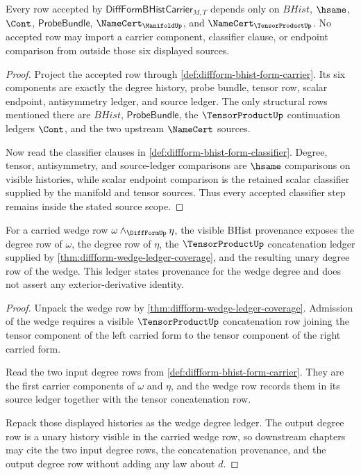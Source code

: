 \begin{theorem}
\label{thm:diffform-source-scope}
Every row accepted by $\mathsf{DiffFormBHistCarrier}_{M,T}$ depends only on
$BHist$, $\hsame$, $\Cont$, $\mathsf{ProbeBundle}$,
$\NameCert_{\ManifoldUp}$, and $\NameCert_{\TensorProductUp}$. No accepted
row may import a carrier component, classifier clause, or endpoint comparison
from outside those six displayed sources.
\end{theorem}
\begin{proof}
Project the accepted row through
\autoref{def:diffform-bhist-form-carrier}. Its six components are exactly the
degree history, probe bundle, tensor row, scalar endpoint, antisymmetry
ledger, and source ledger. The only structural rows mentioned there are
$BHist$, $\mathsf{ProbeBundle}$, the $\TensorProductUp$ continuation ledgers
$\Cont$, and the two upstream $\NameCert$ sources.

Now read the classifier clauses in
\autoref{def:diffform-bhist-form-classifier}. Degree, tensor, antisymmetry,
and source-ledger comparisons are $\hsame$ comparisons on visible histories,
while scalar endpoint comparison is the retained scalar classifier supplied by
the manifold and tensor sources. Thus every accepted classifier step remains
inside the stated source scope.
\end{proof}

\begin{theorem}
\label{thm:diffform-wedge-degree-ledger}
For a carried wedge row $\omega\wedge_{\DiffFormUp}\eta$, the visible BHist
provenance exposes the degree row of $\omega$, the degree row of $\eta$, the
$\TensorProductUp$ concatenation ledger supplied by
\autoref{thm:diffform-wedge-ledger-coverage}, and the resulting unary degree
row of the wedge. This ledger states provenance for the wedge degree and does
not assert any exterior-derivative identity.
\end{theorem}
\begin{proof}
Unpack the wedge row by
\autoref{thm:diffform-wedge-ledger-coverage}. Admission of the wedge requires
a visible $\TensorProductUp$ concatenation row joining the tensor component of
the left carried form to the tensor component of the right carried form.

Read the two input degree rows from
\autoref{def:diffform-bhist-form-carrier}. They are the first carrier
components of $\omega$ and $\eta$, and the wedge row records them in its
source ledger together with the tensor concatenation row.

Repack those displayed histories as the wedge degree ledger. The output
degree row is a unary history visible in the carried wedge row, so downstream
chapters may cite the two input degree rows, the concatenation provenance, and
the output degree row without adding any law about $d$.
\end{proof}

